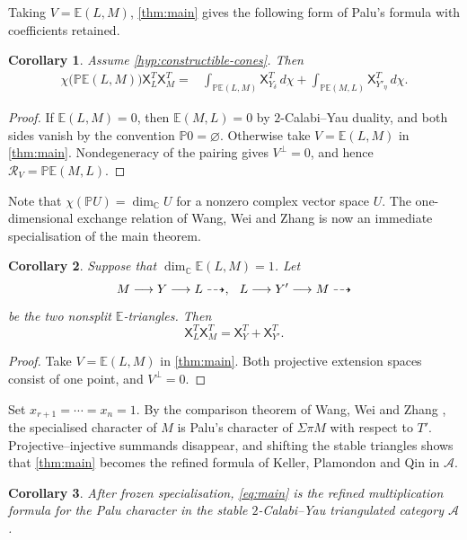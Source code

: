 \documentclass[11pt,reqno]{article}
\numberwithin{equation}{section}
\newtheorem{corollary}[corollary]{Corollary}
\theoremstyle{definition}
\newcommand{\A}{\mathcal A}
\newcommand{\E}{\mathbb E}
\newcommand{\X}{\mathsf X}
\newcommand{\kk}{\mathbb C}
\newcommand{\etri}{\dashrightarrow}
\begin{document}
Taking $V=\E(L,M)$, \cref{thm:main} gives the following form of Palu's formula with coefficients retained.

\begin{corollary}\label{cor:Palu}
Assume \cref{hyp:constructible-cones}.  Then
\begin{align*}
 \chi\bigl(\mathbb P\E(L,M)\bigr)\X^T_L\X^T_M
={}&\int_{\mathbb P\E(L,M)}\X^T_{Y_\delta}\,d\chi
 +\int_{\mathbb P\E(M,L)}\X^T_{Y'_\eta}\,d\chi.
\end{align*}
\end{corollary}

\begin{proof}
If $\E(L,M)=0$, then $\E(M,L)=0$ by $2$-Calabi--Yau duality, and both sides vanish by the convention $\mathbb P0=\varnothing$.  Otherwise take $V=\E(L,M)$ in \cref{thm:main}.  Nondegeneracy of the pairing gives $V^\perp=0$, and hence $\mathcal R_V=\mathbb P\E(M,L)$.
\end{proof}

Note that $\chi(\mathbb P U)=\dim_{\kk}U$ for a nonzero complex vector space $U$.  The one-dimensional exchange relation of Wang, Wei and Zhang \cite[Theorem~4.4]{WangWeiZhangCC} is now an immediate specialisation of the main theorem.

\begin{corollary}\label{cor:exchange}
Suppose that $\dim_{\kk}\E(L,M)=1$.  Let
\[
 M\longrightarrow Y\longrightarrow L\etri,
\hspace{2.5mm}
 L\longrightarrow Y'\longrightarrow M\etri
\]
be the two nonsplit $\E$-triangles.  Then
\[
 \X^T_L\X^T_M=\X^T_Y+\X^T_{Y'}.
\]
\end{corollary}

\begin{proof}
Take $V=\E(L,M)$ in \cref{thm:main}. Both projective extension spaces consist of one point, and $V^\perp=0$.
\end{proof}



Set $x_{r+1}=\cdots=x_n=1$.  By the comparison theorem of Wang, Wei and Zhang \cite[Proposition~4.5]{WangWeiZhangCC}, the specialised character of $M$ is Palu's character of $\Sigma\pi M$ with respect to $T'$.  Projective--injective summands disappear, and shifting the stable triangles shows that \cref{thm:main} becomes the refined formula of Keller, Plamondon and Qin in $\A$.

\begin{corollary}\label{cor:stable}
After frozen specialisation, \eqref{eq:main} is the refined multiplication formula for the Palu character in the stable $2$-Calabi--Yau triangulated category $\A$.
\end{corollary}
\end{document}
